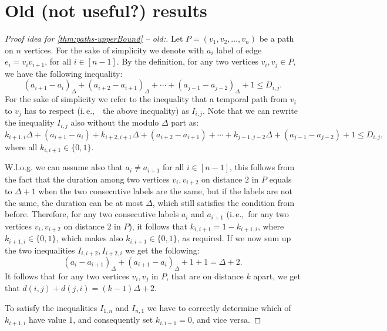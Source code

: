 \documentclass[a4paper,UKenglish,cleveref, autoref, thm-restate]{lipics-v2021}
\newcommand{\ie}{i.\,e.,\ }
\begin{document}
\clearpage
\section{Old (not useful?) results}
\begin{proof}[Proof idea for \cref{thm:paths-upperBound} -- old:]
	Let $P = (v_1, v_2, \dots, v_n)$ be a path on $n$ vertices.
	For the sake of simplicity we denote with $a_i$ label of edge $e_i =v_iv_{i+1}$, for all $i \in [n-1]$.
	By the definition, for any two vertices $v_i,v_j \in P$, we have the following inequality:
	\begin{equation*}
		(a_{i+1} - a_i)_\Delta + (a_{i+2} - a_{i+1})_\Delta + \cdots + (a_{j-1} - a_{j-2})_\Delta + 1
		\leq D_{i,j}.
	\end{equation*}
	For the sake of simplicity we refer to the inequality that a temporal path from $v_i$ to $v_j$ has to respect (\ie~the above inequality) 
	as $I_{i,j}$.
	Note that we can rewrite the inequality $I_{i,j}$ also without the modulo $\Delta$ part as:
	\begin{equation*}
		k_{i+1,i} \Delta + (a_{i+1} - a_i)+ k_{i+2,i+1} \Delta + (a_{i+2} - a_{i+1}) + \cdots + k_{j-1,j-2} \Delta + (a_{j-1} - a_{j-2})+ 1
		\leq D_{i,j},
	\end{equation*}
	where all $k_{i,i+1} \in \{0,1\}$.
	
	W.l.o.g. we can assume also that $a_i \neq a_{i+1}$ for all $i \in [n-1]$,
	this follows from the fact that the duration among two vertices $v_i, v_{i+2}$ on distance $2$ in $P$ equals to $\Delta + 1$ when the two consecutive labels are the same, but if the labels are not the same, the duration can be at most $\Delta$, which still satisfies the condition from before.
	Therefore, for any two consecutive labels $a_i$ and $a_{i+1}$ (\ie for any two vertices $v_i, v_{i+2}$ on distance $2$ in $P$), 
	it follows that 
	$k_{i, i+1} = 1 - k_{i+1,i}$, where $k_{i+1,i} \in \{0,1\}$, which makes also $k_{i,i+1} \in \{0,1\}$, as required.
	If we now sum up the two inequalities $I_{i,i+2}, I_{i+2,i}$ we get the following:
	\begin{equation*}
		(a_i-a_{i+1})_\Delta + (a_{i+1}-a_i)_\Delta +1 +1 = \Delta + 2.
	\end{equation*}
	It follows that for any two vertices $v_i, v_j$ in $P$, that are on distance $k$ apart, 
	we get that $d(i,j) + d(j,i) = (k-1) \Delta + 2$.
	
	To satisfy the inequalities $I_{1,n}$ and $I_{n,1}$ we have to correctly determine which of $k_{i+1,i}$ have value $1$, and consequently set $k_{i,i+1} = 0$,
	and vice versa.
	

\end{proof}
\end{document}
